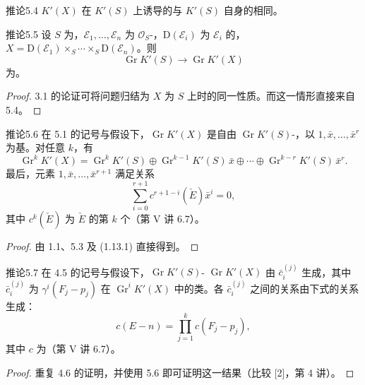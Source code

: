 \begin{SGAresult}{推论}{5.4}
$K'(X)$ 在 $K'(S)$ 上诱导的与 $K'(S)$ 自身的相同。
\end{SGAresult}

\begin{SGAresult}{推论}{5.5}
设 $S$ 为，$\mathcal E_1,\ldots,\mathcal E_n$ 为 $\mathcal O_S$-，$\mathrm D(\mathcal E_i)$ 为 $\mathcal E_i$ 的，$X=\mathrm D(\mathcal E_1)\times_S\cdots\times_S\mathrm D(\mathcal E_n)$。则
\[
\operatorname{Gr}K'(S)\longrightarrow\operatorname{Gr}K'(X)
\]
为。
\end{SGAresult}
\begin{proof}
3.1 的论证可将问题归结为 $X$ 为 $S$ 上时的同一性质。而这一情形直接来自 5.4。
\end{proof}

\begin{SGAresult}{推论}{5.6}
在 5.1 的记号与假设下，$\operatorname{Gr}K'(X)$ 是自由 $\operatorname{Gr}K'(S)$-，以 $1,\bar x,\ldots,\bar x^r$ 为基。对任意 $k$，有
\[
\operatorname{Gr}^kK'(X)=\operatorname{Gr}^kK'(S)\oplus\operatorname{Gr}^{k-1}K'(S)\,\bar x\oplus\cdots\oplus\operatorname{Gr}^{k-r}K'(S)\,\bar x^r.
\]
最后，元素 $1,\bar x,\ldots,\bar x^{r+1}$ 满足关系
\[
\sum_{i=0}^{r+1}c^{r+1-i}(\check E)\bar x^i=0,
\]
其中 $c^k(\check E)$ 为 $\check E$ 的第 $k$ 个（第 V 讲 6.7）。
\end{SGAresult}
\begin{proof}
由 1.1、5.3 及 (1.13.1) 直接得到。
\end{proof}

\begin{SGAresult}{推论}{5.7}
在 4.5 的记号与假设下，$\operatorname{Gr}K'(S)$- $\operatorname{Gr}K'(X)$ 由 $\bar c_i^{(j)}$ 生成，其中 $\bar c_i^{(j)}$ 为 $\gamma^i(F_j-p_j)$ 在 $\operatorname{Gr}^iK'(X)$ 中的类。各 $\bar c_i^{(j)}$ 之间的关系由下式的关系生成：
\[
c(E-n)=\prod_{j=1}^k c(F_j-p_j),
\]
其中 $c$ 为（第 V 讲 6.7）。
\end{SGAresult}
\begin{proof}
重复 4.6 的证明，并使用 5.6 即可证明这一结果（比较 [2]，第 4 讲）。
\end{proof}

